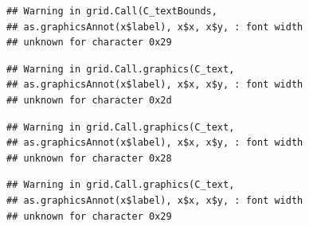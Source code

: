 \documentclass[
]{book}
\begin{document}
\begin{verbatim}
## Warning in grid.Call(C_textBounds,
## as.graphicsAnnot(x$label), x$x, x$y, : font width
## unknown for character 0x29
\end{verbatim}

\begin{verbatim}
## Warning in grid.Call.graphics(C_text,
## as.graphicsAnnot(x$label), x$x, x$y, : font width
## unknown for character 0x2d
\end{verbatim}

\begin{verbatim}
## Warning in grid.Call.graphics(C_text,
## as.graphicsAnnot(x$label), x$x, x$y, : font width
## unknown for character 0x28
\end{verbatim}

\begin{verbatim}
## Warning in grid.Call.graphics(C_text,
## as.graphicsAnnot(x$label), x$x, x$y, : font width
## unknown for character 0x29
\end{verbatim}
\end{document}
